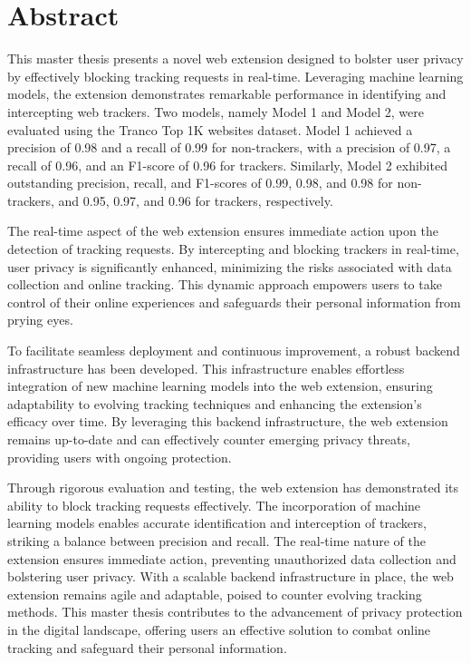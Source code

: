 \chapter*{Abstract}
\label{cha:abstract}

This master thesis presents a novel web extension designed to bolster user privacy by effectively blocking tracking
requests in real-time. Leveraging machine learning models, the extension demonstrates remarkable performance in identifying
and intercepting web trackers. Two models, namely Model 1 and Model 2, were evaluated using the Tranco Top 1K websites dataset.
Model 1 achieved a precision of 0.98 and a recall of 0.99 for non-trackers, with a precision of 0.97, a recall of 0.96, and an
F1-score of 0.96 for trackers. Similarly, Model 2 exhibited outstanding precision, recall, and F1-scores of 0.99, 0.98, and 0.98
for non-trackers, and 0.95, 0.97, and 0.96 for trackers, respectively.

The real-time aspect of the web extension ensures immediate action upon the detection of tracking requests. By intercepting
and blocking trackers in real-time, user privacy is significantly enhanced, minimizing the risks associated with data collection
and online tracking. This dynamic approach empowers users to take control of their online experiences and safeguards their personal
information from prying eyes.

To facilitate seamless deployment and continuous improvement, a robust backend infrastructure has been developed. This infrastructure
enables effortless integration of new machine learning models into the web extension, ensuring adaptability to evolving tracking
techniques and enhancing the extension's efficacy over time. By leveraging this backend infrastructure, the web extension remains
up-to-date and can effectively counter emerging privacy threats, providing users with ongoing protection.

Through rigorous evaluation and testing, the web extension has demonstrated its ability to block tracking requests effectively.
The incorporation of machine learning models enables accurate identification and interception of trackers, striking a balance
between precision and recall. The real-time nature of the extension ensures immediate action, preventing unauthorized data
collection and bolstering user privacy. With a scalable backend infrastructure in place, the web extension remains agile and
adaptable, poised to counter evolving tracking methods. This master thesis contributes to the advancement of privacy protection
in the digital landscape, offering users an effective solution to combat online tracking and safeguard their personal information.



